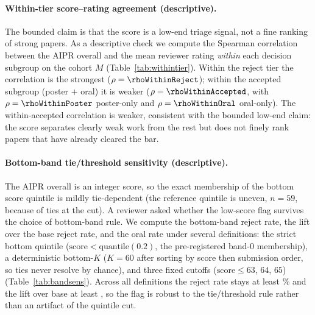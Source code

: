 \begin{table}[h]
  \centering
  \caption{Covariate-control cross-validated AUROC (descriptive): the AIPR
  overall alone vs.\ the overall plus primary area and manuscript-surface
  covariates, under one stratified five-fold protocol per cohort. Exploratory
  confound audit, not a confirmatory replacement for the headline AUROC.}
  \label{tab:covcontrol}
  
\end{table}

\paragraph{Within-tier score--rating agreement (descriptive).} The bounded claim
is that the score is a low-end triage signal, not a fine ranking of strong
papers. As a descriptive check we compute the Spearman correlation between the
AIPR overall and the mean reviewer rating \emph{within} each decision subgroup on
the cohort $M$ (Table~\ref{tab:withintier}). Within the reject tier the
correlation is the strongest ($\rho=\rhoWithinReject$); within the accepted
subgroup (poster $+$ oral) it is weaker ($\rho=\rhoWithinAccepted$, with
$\rho=\rhoWithinPoster$ poster-only and $\rho=\rhoWithinOral$ oral-only).
The within-accepted correlation is weaker, consistent with the bounded low-end
claim: the score separates clearly weak work from the rest but does not finely
rank papers that have already cleared the bar.

\begin{table}[h]
  \centering
  \caption{Within-subgroup Spearman correlation of the AIPR overall with the mean
  reviewer rating (cohort $M$, descriptive). The within-accepted
  correlation is weaker, consistent with a low-end triage signal rather than a
  fine ranking of strong papers.}
  \label{tab:withintier}
  
\end{table}

\paragraph{Bottom-band tie/threshold sensitivity (descriptive).} The AIPR overall
is an integer score, so the exact membership of the bottom score quintile is
mildly tie-dependent (the reference quintile is uneven, $n=59$, because of ties at
the cut). A reviewer asked whether the low-score flag survives the choice of
bottom-band rule. We compute the bottom-band reject rate, the lift over the base
reject rate, and the oral rate under several definitions: the strict bottom
quintile (\mbox{$\text{score}<\text{quantile}(0.2)$}, the pre-registered band-0
membership), a deterministic bottom-$K$ ($K=60$ after sorting by score then
submission order, so ties never resolve by chance), and three fixed cutoffs
(\mbox{$\text{score}\le63$}, $64$, $65$) (Table~\ref{tab:bandsens}). Across all
\bandSensNdefs{} definitions the reject rate stays at least \bandSensMinReject\%
and the lift over base at least \bandSensMinLift{}, so the flag is robust to the
tie/threshold rule rather than an artifact of the quintile cut.

